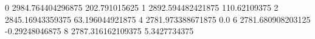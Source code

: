 0 2984.764404296875 202.791015625
1 2892.594482421875 110.62109375
2 2845.16943359375 63.196044921875
4 2781.973388671875 0.0
6 2781.680908203125 -0.29248046875
8 2787.316162109375 5.3427734375
